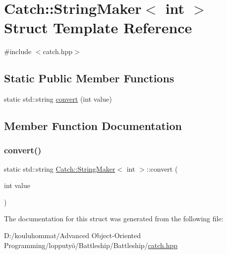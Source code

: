 \hypertarget{struct_catch_1_1_string_maker_3_01int_01_4}{}\section{Catch\+:\+:String\+Maker$<$ int $>$ Struct Template Reference}
\label{struct_catch_1_1_string_maker_3_01int_01_4}


{\ttfamily \#include $<$catch.\+hpp$>$}

\subsection*{Static Public Member Functions}
\begin{DoxyCompactItemize}
\item 
static std\+::string \mbox{\hyperlink{struct_catch_1_1_string_maker_3_01int_01_4_aab096e55fb7283f6ad47b5ca277e22e8}{convert}} (int value)
\end{DoxyCompactItemize}


\subsection{Member Function Documentation}
\mbox{\label{struct_catch_1_1_string_maker_3_01int_01_4_aab096e55fb7283f6ad47b5ca277e22e8}} 
\subsubsection{\texorpdfstring{convert()}{convert()}}
{\footnotesize\ttfamily static std\+::string \mbox{\hyperlink{struct_catch_1_1_string_maker}{Catch\+::\+String\+Maker}}$<$ int $>$\+::convert (\begin{DoxyParamCaption}\item[{int}]{value }\end{DoxyParamCaption})\hspace{0.3cm}{\ttfamily [static]}}



The documentation for this struct was generated from the following file\+:\begin{DoxyCompactItemize}
\item 
D\+:/kouluhommat/\+Advanced Object-\/\+Oriented Programming/lopputyö/\+Battleship/\+Battleship/\mbox{\hyperlink{catch_8hpp}{catch.\+hpp}}\end{DoxyCompactItemize}
